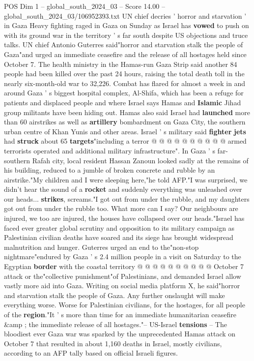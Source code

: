 \begin{textsample}{POS Dim 1 – global\_south\_2024\_03 – Score 14.00 – global\_south\_2024\_03/106952393.txt}  \label{ex:f1_pos_344}
UN chief decries ' horror and starvation ' in Gaza Heavy fighting raged in Gaza on Sunday as Israel has \textbf{vowed} to push on with its ground war in the territory ' s far south despite US objections and truce talks.
UN chief Antonio Guterres said"horror and starvation stalk the people of Gaza"and urged an immediate ceasefire and the release of all hostages held since October 7.
The health ministry in the Hamas-run Gaza Strip said another 84 people had been killed over the past 24 hours, raising the total death toll in the nearly six-month-old war to 32,226.
Combat has flared for almost a week in and around Gaza ' s biggest hospital complex, Al-Shifa, which has been a refuge for patients and displaced people and where Israel says Hamas and \textbf{Islamic} Jihad group militants have been hiding out.
Hamas also said Israel had \textbf{launched} more than 60 airstrikes as well as \textbf{artillery} bombardment on Gaza City, the southern urban centre of Khan Yunis and other areas.
Israel ' s military said \textbf{fighter} \textbf{jets} had \textbf{struck} about 65 \textbf{targets}"including a terror @ @ @ @ @ @ @ @ @ @ armed terrorists operated and additional military infrastructure".
In Gaza ' s far-southern Rafah city, local resident Hassan Zanoun looked sadly at the remains of his building, reduced to a jumble of broken concrete and rubble by an airstrike."My children and I were sleeping here,"he told AFP."I was surprised, we didn't hear the sound of a \textbf{rocket} and suddenly everything was unleashed over our heads... \textbf{strikes}, screams."I got out from under the rubble, and my daughters got out from under the rubble too.
What more can I say?
Our neighbours are injured, we too are injured, the houses have collapsed over our heads."Israel has faced ever greater global scrutiny and opposition to its military campaign as Palestinian civilian deaths have soared and its siege has brought widespread malnutrition and hunger.
Guterres urged an end to the"non-stop nightmare"endured by Gaza ' s 2.4 million people in a visit on Saturday to the Egyptian \textbf{border} with the coastal territory @ @ @ @ @ @ @ @ @ @ October 7 attack or the"collective punishment"of Palestinians, and demanded Israel allow vastly more aid into Gaza.
Writing on social media platform X, he said"horror and starvation stalk the people of Gaza.
Any further onslaught will make everything worse.
Worse for Palestinian civilians, for the hostages, for all people of the \textbf{region}."It ' s more than time for an immediate humanitarian ceasefire \&amp ; the immediate release of all hostages."-- US-Israel \textbf{tensions} -- The bloodiest ever Gaza war was sparked by the unprecedented Hamas attack on October 7 that resulted in about 1,160 deaths in Israel, mostly civilians, according to an AFP tally based on official Israeli figures.

\end{textsample}
